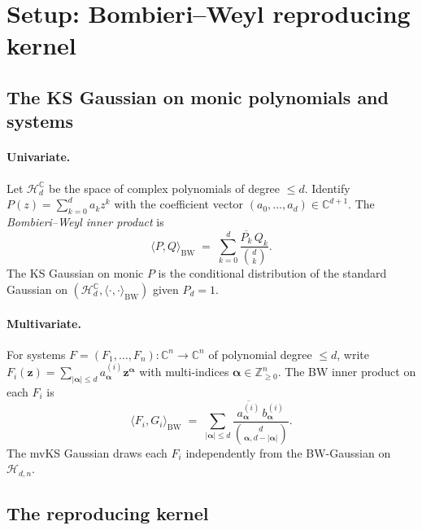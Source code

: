 \documentclass[11pt,a4paper]{article}
\begin{document}
\tableofcontents

\section{Setup: Bombieri--Weyl reproducing kernel}\label{sec:setup}

\subsection{The KS Gaussian on monic polynomials and systems}

\paragraph{Univariate.}
Let $\mathcal{H}_d^{\mathbb{C}}$ be the space of complex polynomials of degree $\le d$. Identify $P(z) = \sum_{k=0}^{d} a_k z^k$ with the coefficient vector $(a_0, \dots, a_d) \in \mathbb{C}^{d+1}$. The \emph{Bombieri--Weyl inner product} is
\begin{equation}\label{eq:BW-univariate}
\langle P, Q \rangle_{\mathrm{BW}} \;=\; \sum_{k=0}^{d} \frac{\overline{P_k}\, Q_k}{\binom{d}{k}}.
\end{equation}
The KS Gaussian on monic $P$ is the conditional distribution of the standard Gaussian on $(\mathcal{H}_d^{\mathbb{C}}, \langle\cdot,\cdot\rangle_{\mathrm{BW}})$ given $P_d = 1$.

\paragraph{Multivariate.}
For systems $F = (F_1, \dots, F_n) : \mathbb{C}^n \to \mathbb{C}^n$ of polynomial degree $\le d$, write $F_i(\mathbf{z}) = \sum_{|\boldsymbol\alpha| \le d} a^{(i)}_{\boldsymbol\alpha} \mathbf{z}^{\boldsymbol\alpha}$ with multi-indices $\boldsymbol\alpha \in \mathbb{Z}_{\ge 0}^n$. The BW inner product on each $F_i$ is
\begin{equation}\label{eq:BW-multivariate}
\langle F_i, G_i \rangle_{\mathrm{BW}} \;=\; \sum_{|\boldsymbol\alpha| \le d} \frac{\overline{a^{(i)}_{\boldsymbol\alpha}}\, b^{(i)}_{\boldsymbol\alpha}}{\binom{d}{\boldsymbol\alpha, d - |\boldsymbol\alpha|}}.
\end{equation}
The mvKS Gaussian draws each $F_i$ independently from the BW-Gaussian on $\mathcal{H}_{d,n}$.

\subsection{The reproducing kernel}
\end{document}
